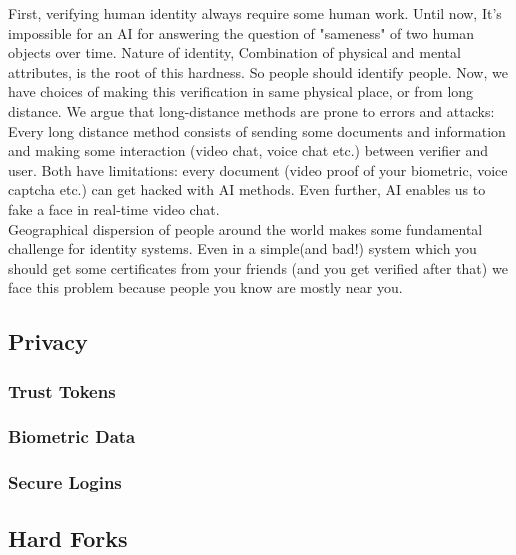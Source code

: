 \documentclass[conference]{IEEEtran}
\begin{document}
First, verifying human identity always require some human work. Until now, It's impossible for an AI for answering the question of "sameness" of two human objects over time. Nature of identity, Combination of physical and mental attributes, is the root of this hardness. So people should identify people. Now, we have choices of making this verification in same physical place, or from long distance. We argue that long-distance methods are prone to errors and attacks: Every long distance method consists of sending some documents and information and making some interaction (video chat, voice chat etc.) between verifier and user. Both have limitations: every document (video proof of your biometric, voice captcha etc.) can get hacked with AI methods. Even further, AI enables us to fake a face in real-time video chat.
\\
Geographical dispersion of people around the world makes some fundamental challenge for identity systems. Even in a simple(and bad!) system which you should get some certificates from your friends (and you get verified after that) we face this problem because people you know are mostly near you. 



\subsection{Privacy}
\subsubsection*{Trust Tokens}
\subsubsection*{Biometric Data}
\subsubsection*{Secure Logins}

\subsection{Hard Forks}
\end{document}
